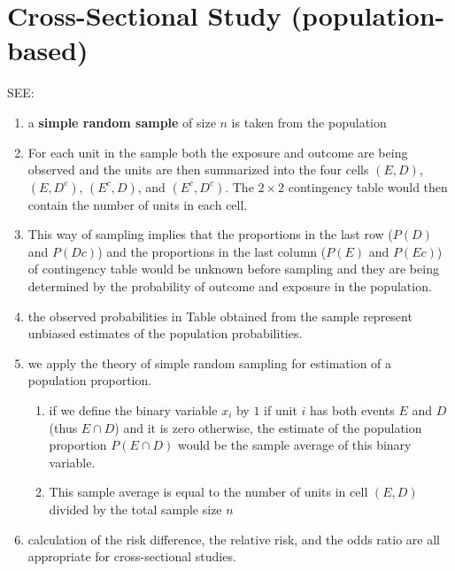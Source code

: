 \section{Cross-Sectional Study (population-based)}

SEE: 

\begin{enumerate}
    \item a \textbf{simple random sample} of size $n$ is taken from the population
    \hfill \cite{statistics/book/Statistics-for-Data-Scientists/Maurits-Kaptein}

    \item For each unit in the sample both the exposure and outcome are being observed and the units are then summarized into the four cells $(E, D)$, $(E, D^c)$, $(E^c, D)$, and $(E^c, D^c)$. 
    The $2 \times 2$ contingency table would then contain the number of units in each cell.
    \hfill \cite{statistics/book/Statistics-for-Data-Scientists/Maurits-Kaptein}

    \item This way of sampling implies that the proportions in the last row ($P(D)$ and $P(Dc)$) and the proportions in the last column ($P(E)$ and $P(Ec)$) of contingency table would be unknown before sampling and they are being determined by the probability of outcome and exposure in the population.
    \hfill \cite{statistics/book/Statistics-for-Data-Scientists/Maurits-Kaptein}

    \item the observed probabilities in Table  obtained from the sample represent unbiased estimates of the population probabilities.
    \hfill \cite{statistics/book/Statistics-for-Data-Scientists/Maurits-Kaptein}

    \item we apply the theory of simple random sampling for estimation of a population proportion.
    \hfill \cite{statistics/book/Statistics-for-Data-Scientists/Maurits-Kaptein}
    \begin{enumerate}
        \item if we define the binary variable $x_i$ by $1$ if unit $i$ has both events $E$ and $D$ (thus $E \cap D$) and it is zero otherwise, the estimate of the population proportion $P(E \cap D)$ would be the sample average of this binary variable. 

        \item This sample average is equal to the number of units in cell $(E, D)$ divided by the total sample size $n$
    \end{enumerate}
    \hfill \cite{statistics/book/Statistics-for-Data-Scientists/Maurits-Kaptein}

    \item calculation of the risk difference, the relative risk, and the odds ratio are all appropriate for cross-sectional studies.
    \hfill \cite{statistics/book/Statistics-for-Data-Scientists/Maurits-Kaptein}
\end{enumerate}















